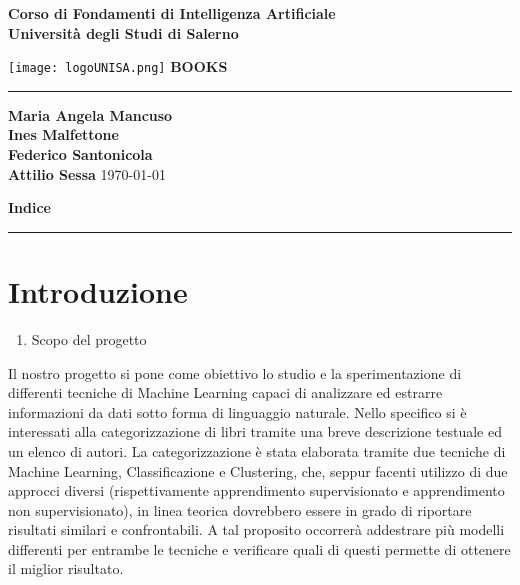 \documentclass[12pt,oneside]{article}
\begin{document}

\begin{titlepage}
    \begin{flushright}
        \textbf{Corso di Fondamenti di Intelligenza Artificiale}
        \textbf{\\Università degli Studi di Salerno}
    \end{flushright}
    \vspace*{1.5cm}
    \centering
    \texttt{[image: logoUNISA.png]}
    \vfill
    \Huge\textbf{BOOKS}
    \vspace{1ex}
    \rule{\linewidth}{1pt}
    \Large\textbf{Maria Angela Mancuso \\
        Ines Malfettone \\
        Federico Santonicola \\
        Attilio Sessa}
    \vfill
    \today
\end{titlepage}

\clearpage %

\setcounter{page}{1}

\begin{flushright}
        \Large\textbf{Indice}
\end{flushright}
\rule{\linewidth}{1pt}



\clearpage
\setcounter{section}{0}
\section{Introduzione}
    \begin{enumerate}
        \item Scopo del progetto
    \end{enumerate}
    \begin{flushleft}
    
        Il nostro progetto si pone come obiettivo lo studio e la sperimentazione di differenti tecniche di Machine Learning capaci di analizzare ed estrarre informazioni da dati sotto forma di linguaggio naturale. Nello specifico si è interessati alla categorizzazione di libri tramite una breve descrizione testuale ed un elenco di autori. La categorizzazione è stata elaborata tramite due tecniche di Machine Learning, Classificazione e Clustering, che, seppur facenti utilizzo di due approcci diversi (rispettivamente apprendimento supervisionato e apprendimento non supervisionato), in linea teorica dovrebbero essere in grado di riportare risultati similari e confrontabili. A tal proposito occorrerà addestrare più modelli differenti per entrambe le tecniche e verificare quali di questi permette di ottenere il miglior risultato.
        
    \end{flushleft}
\end{document}
